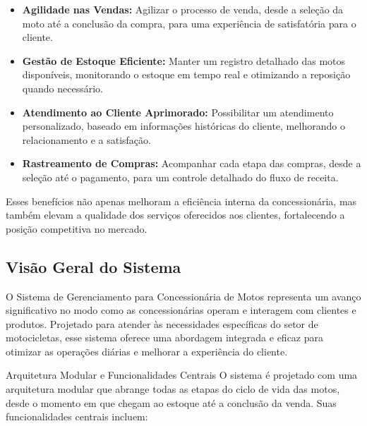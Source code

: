 		\begin{itemize}
			\item \textbf{Agilidade nas Vendas:}  Agilizar o processo de venda, desde a seleção da moto até a conclusão da compra, para uma experiência de satisfatória para o cliente.
			
			\item \textbf{Gestão de Estoque Eficiente:} Manter um registro detalhado das motos disponíveis, monitorando o estoque em tempo real e otimizando a reposição quando necessário.
			
			\item \textbf{Atendimento ao Cliente Aprimorado:} Possibilitar um atendimento personalizado, baseado em informações históricas do cliente, melhorando o relacionamento e a satisfação.
			
			\item \textbf{Rastreamento de Compras:} Acompanhar cada etapa das compras, desde a seleção até o pagamento, para um controle detalhado do fluxo de receita.
			
		\end{itemize}
		 
		 Esses benefícios não apenas melhoram a eficiência interna da concessionária, mas também elevam a qualidade dos serviços oferecidos aos clientes, fortalecendo a posição competitiva no mercado.
		 
        \subsection{Visão Geral do Sistema}
        O Sistema de Gerenciamento para Concessionária de Motos representa um avanço significativo no modo como as concessionárias operam e interagem com clientes e produtos. Projetado para atender às necessidades específicas do setor de motocicletas, esse sistema oferece uma abordagem integrada e eficaz para otimizar as operações diárias e melhorar a experiência do cliente.
        
        Arquitetura Modular e Funcionalidades Centrais
        O sistema é projetado com uma arquitetura modular que abrange todas as etapas do ciclo de vida das motos, desde o momento em que chegam ao estoque até a conclusão da venda. Suas funcionalidades centrais incluem:
        
